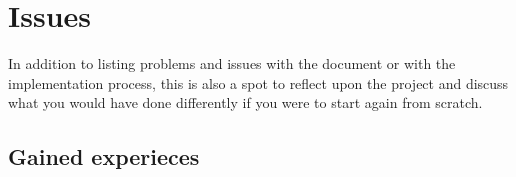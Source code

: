 \section{Issues}

In addition to listing problems and issues with the document or with the implementation process, this is also a spot to reflect upon the project and discuss what you would have done differently if you were to start again from scratch.

\subsection{Gained experieces}




